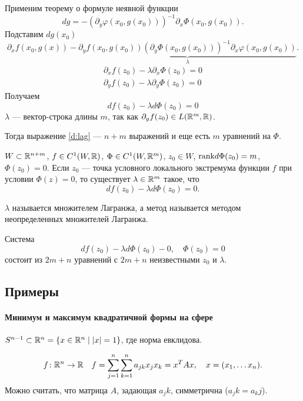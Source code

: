  Применим теорему о формуле неявной функции
 \[
     dg = - \left( \partial _y \varphi (x_0, g(x_0)) \right)^{-1} \partial _x \Phi(x_0, g(x_0))
 .\] 
 Подставим $ dg(x_0)$
 \[
     \partial _x f(x_0, g(x)) - \underbrace{\partial _y f(x_0, g(x_0)) \left( \partial _y \Phi(x_0, g(x_0)) \right)^{-1} \partial _x \varphi (x_0, g(x_0))}_{\lambda}
 .\] 
\[
\begin{aligned}
    \partial _x f(z_0) - \lambda \partial _x \Phi(z_0) = 0 \\
    \partial _y f(z_0) - \lambda \partial _y \Phi(z_0) = 0
\end{aligned}
\] 
Получаем 
\begin{equation}\label{d:lag}
    df(z_0) - \lambda d\Phi(z_0) = 0
\end{equation}
$ \lambda$ --- вектор-строка длины  $ m$, так как $ \partial _y f(z_0) \in  L(\mathbb{R}^{m} , \mathbb{R})$.

Тогда выражение \ref{d:lag} --- $ n+m$ выражений и еще есть $ m$ уравнений на $ \Phi$.
\begin{thm}
    $ W \subset \mathbb{R}^{n+m}$, $ f \in C^{1}(W, \mathbb{R})$, $ \Phi \in C^{1}(W, \mathbb{R}^{m})$, $ z_0 \in W$, $ {\mathop{\text{\rm rank}}} d\Phi(z_0) = m$, $ \Phi(z_0) = 0$.  Если $ z_0$ --- точка условного локального экстремума функции $ f$ при условии  $ \Phi(z) = 0$, то существует  $ \lambda \in \mathbb{R}^{m}$ такое, что
    \[
	df(z_0) - \lambda d\Phi(z_0) = 0
    .\] 
\end{thm}
\begin{defn}
    $ \lambda$ называется {\sf множителем Лагранжа}, а метод называется {\sf методом неопределенных множителей Лагранжа}.    
\end{defn}
\begin{note}
    Система 
    \[
	df(z_0) - \lambda d\Phi(z_0) - 0, \quad \Phi(z_0) = 0
    \] 
    состоит из $ 2m+n$ уравнений с  $ 2m+n$ неизвестными  $ z_0$ и $ \lambda$.
\end{note}
\subsection{Примеры}
\paragraph{Минимум и максимум квадратичной формы на сфере}
$ S^{n-1} \subset \mathbb{R}^{n} = \{x \in \mathbb{R}^{n} \mid \lvert x \rvert = 1\}$, где норма евклидова.

\[
    f\colon \mathbb{R}^{n} \to  \mathbb{R} \quad f = \sum_{j=1}^{n} \sum_{k=1}^{n} a_{jk} x_j x_k = x^{T}Ax, \quad x = (x_1, \ldots x_{n})
.\] 
Можно считать, что матрица $ A$, задающая $ a_jk$, симметрична ($ a_jk = a_kj$).

